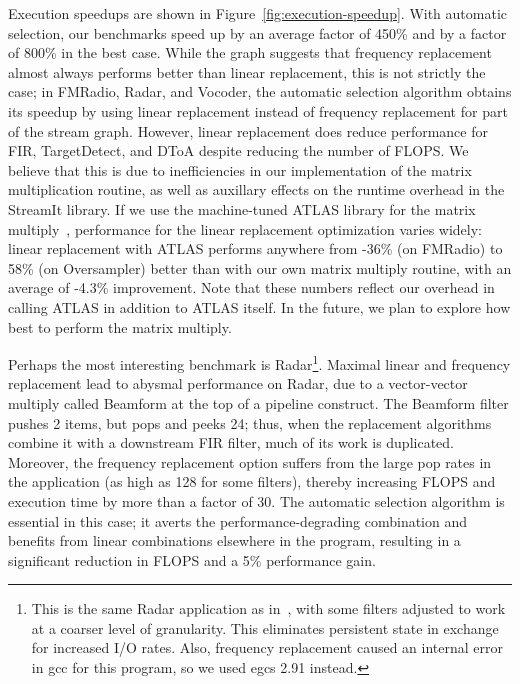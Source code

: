 Execution speedups are shown in Figure~\ref{fig:execution-speedup}.
With automatic selection, our benchmarks speed up by an average factor
of 450\% and by a factor of 800\% in the best case.  While the graph
suggests that frequency replacement almost always performs better than
linear replacement, this is not strictly the case; in FMRadio, Radar,
and Vocoder, the automatic selection algorithm obtains its speedup by
using linear replacement instead of frequency replacement for part of
the stream graph.  However, linear replacement does reduce performance
for FIR, TargetDetect, and DToA despite reducing the number of FLOPS.
We believe that this is due to inefficiencies in our implementation of
the matrix multiplication routine, as well as auxillary effects on the
runtime overhead in the StreamIt library.  If we use the machine-tuned
ATLAS library for the matrix multiply~\cite{whaley01automated},
performance for the linear replacement optimization varies widely:
linear replacement with ATLAS performs anywhere from -36\% (on
FMRadio) to 58\% (on Oversampler) better than with our own matrix
multiply routine, with an average of -4.3\% improvement.  Note that
these numbers reflect our overhead in calling ATLAS in addition to
ATLAS itself.  In the future, we plan to explore how best to perform
the matrix multiply.

Perhaps the most interesting benchmark is Radar\footnote{\small This
is the same Radar application as in~\cite{streamit-asplos}, with some
filters adjusted to work at a coarser level of granularity.  This
eliminates persistent state in exchange for increased I/O rates.
Also, frequency replacement caused an internal error in gcc for this
program, so we used egcs 2.91 instead.}.  Maximal linear and frequency
replacement lead to abysmal performance on Radar, due to a
vector-vector multiply called Beamform at the top of a pipeline
construct.  The Beamform filter pushes 2 items, but pops and peeks 24;
thus, when the replacement algorithms combine it with a downstream FIR
filter, much of its work is duplicated.  Moreover, the frequency
replacement option suffers from the large pop rates in the application
(as high as 128 for some filters), thereby increasing FLOPS and
execution time by more than a factor of 30.  The automatic selection
algorithm is essential in this case; it averts the
performance-degrading combination and benefits from linear
combinations elsewhere in the program, resulting in a significant
reduction in FLOPS and a 5\% performance gain.


